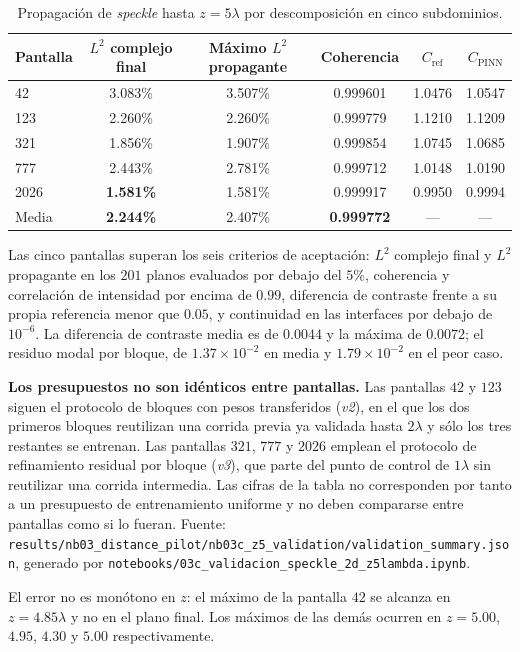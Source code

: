 \begin{table}[htbp]
\centering
\begin{threeparttable}
\caption{Propagación de \textit{speckle} hasta $z=5\lambda$ por descomposición
en cinco subdominios.}
\label{tab:nb03_z5}
\begin{tabular}{lccccc}
\toprule
Pantalla & $L^2$ complejo final & Máximo $L^2$ propagante & Coherencia & $C_\text{ref}$ & $C_\text{PINN}$ \\
\midrule
42   & 3.083\% & 3.507\%\tnote{a} & 0.999601 & 1.0476 & 1.0547 \\
123  & 2.260\% & 2.260\%          & 0.999779 & 1.1210 & 1.1209 \\
321  & 1.856\% & 1.907\%          & 0.999854 & 1.0745 & 1.0685 \\
777  & 2.443\% & 2.781\%          & 0.999712 & 1.0148 & 1.0190 \\
2026 & \textbf{1.581\%} & 1.581\% & 0.999917 & 0.9950 & 0.9994 \\
\midrule
Media & \textbf{2.244\%} & 2.407\% & \textbf{0.999772} & --- & --- \\
\bottomrule
\end{tabular}
\begin{tablenotes}\small
    \item Las cinco pantallas superan los seis criterios de aceptación: $L^2$
    complejo final y $L^2$ propagante en los $201$ planos evaluados por debajo
    del $5\%$, coherencia y correlación de intensidad por encima de $0.99$,
    diferencia de contraste frente a su propia referencia menor que $0.05$, y
    continuidad en las interfaces por debajo de $10^{-6}$. La diferencia de
    contraste media es de $0.0044$ y la máxima de $0.0072$; el residuo modal
    por bloque, de $1.37\times10^{-2}$ en media y $1.79\times10^{-2}$ en el peor
    caso.
    \item \textbf{Los presupuestos no son idénticos entre pantallas.} Las
    pantallas $42$ y $123$ siguen el protocolo de bloques con pesos
    transferidos (\textit{v2}), en el que los dos primeros bloques reutilizan
    una corrida previa ya validada hasta $2\lambda$ y sólo los tres restantes se
    entrenan. Las pantallas $321$, $777$ y $2026$ emplean el protocolo de
    refinamiento residual por bloque (\textit{v3}), que parte del punto de
    control de $1\lambda$ sin reutilizar una corrida intermedia. Las cifras de
    la tabla no corresponden por tanto a un presupuesto de entrenamiento
    uniforme y no deben compararse entre pantallas como si lo fueran. Fuente:
    \texttt{results/nb03\_distance\_pilot/nb03c\_z5\_validation/validation\_summary.json},
    generado por
    \texttt{notebooks/03c\_validacion\_speckle\_2d\_z5lambda.ipynb}.
    \item[a] El error no es monótono en $z$: el máximo de la pantalla $42$ se
    alcanza en $z=4.85\lambda$ y no en el plano final. Los máximos de las demás
    ocurren en $z=5.00$, $4.95$, $4.30$ y $5.00$ respectivamente.
\end{tablenotes}
\end{threeparttable}
\end{table}

